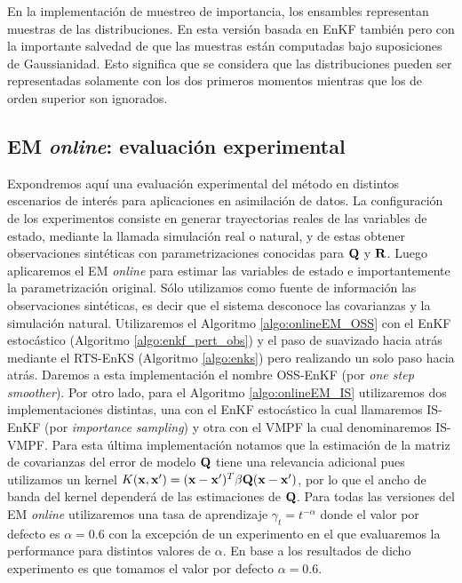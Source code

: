 En la implementación de muestreo de importancia, los ensambles representan muestras de las distribuciones. En esta versión basada en EnKF también pero con la importante salvedad de que las muestras están computadas bajo suposiciones de Gaussianidad. Esto significa que se considera que las distribuciones pueden ser representadas solamente con los dos primeros momentos mientras que los de orden superior son ignorados.

\subsection{EM \textit{online}: evaluación experimental}

Expondremos aquí una evaluación experimental del método en distintos escenarios de interés para aplicaciones en asimilación de datos. La configuración de los experimentos consiste en generar trayectorias reales de las variables de estado, mediante la llamada simulación real o natural, y de estas obtener observaciones sintéticas con parametrizaciones conocidas para $\mathbf{Q}$ y $\mathbf{R}$. Luego aplicaremos el EM \textit{online} para estimar las variables de estado e importantemente la parametrización original. Sólo utilizamos como fuente de información las observaciones sintéticas, es decir que el sistema desconoce las covarianzas y la simulación natural. Utilizaremos el Algoritmo \ref{algo:onlineEM_OSS} con el EnKF estocástico (Algoritmo \ref{algo:enkf_pert_obs}) y el paso de suavizado hacia atrás mediante el RTS-EnKS (Algoritmo \ref{algo:enks}) pero realizando un solo paso hacia atrás. Daremos a esta implementación el nombre OSS-EnKF (por \textit{one step smoother}). Por otro lado, para el Algoritmo \ref{algo:onlineEM_IS} utilizaremos dos implementaciones distintas, una con el EnKF estocástico la cual llamaremos IS-EnKF (por \textit{importance sampling}) y otra con el VMPF la cual denominaremos IS-VMPF. Para esta última implementación notamos que la estimación de la matriz de covarianzas del error de modelo $\mathbf{Q}$ tiene una relevancia adicional pues utilizamos un kernel $K(\mathbf{x}, \mathbf{x}') = (\mathbf{x} - \mathbf{x}')^T \beta \mathbf{Q} (\mathbf{x} - \mathbf{x}')$, por lo que el ancho de banda del kernel dependerá de las estimaciones de $\mathbf{Q}$. Para todas las versiones del EM \textit{online} utilizaremos una tasa de aprendizaje $\gamma_t = t^{-\alpha}$ \citep{Legland1997} donde el valor por defecto es $\alpha = 0.6$ con la excepción de un experimento en el que evaluaremos la performance para distintos valores de $\alpha$. En base a los resultados de dicho experimento es que tomamos el valor por defecto $\alpha = 0.6$.

